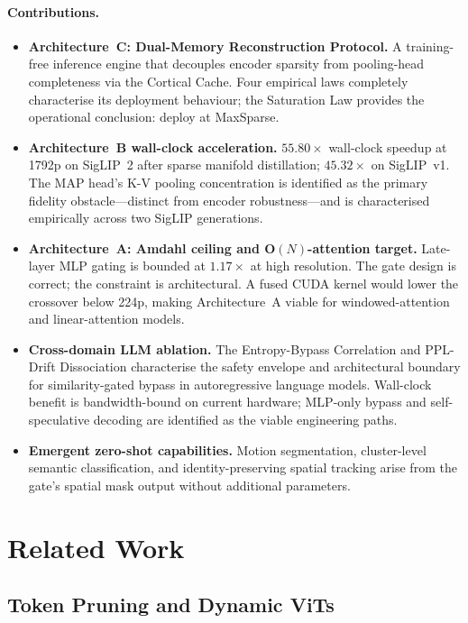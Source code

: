 \documentclass{article}
\begin{document}
\paragraph{Contributions.}
\begin{itemize}
  \item \textbf{Architecture~C: Dual-Memory Reconstruction Protocol.}
    A training-free inference engine that decouples encoder sparsity from
    pooling-head completeness via the Cortical Cache. Four empirical laws
    completely characterise its deployment behaviour; the Saturation Law
    provides the operational conclusion: deploy at MaxSparse.
  \item \textbf{Architecture~B wall-clock acceleration.}
    $55.80\times$ wall-clock speedup at 1792p on SigLIP~2 after sparse
    manifold distillation; $45.32\times$ on SigLIP~v1. The MAP head's
    K-V pooling concentration is identified as the primary fidelity
    obstacle---distinct from encoder robustness---and is characterised
    empirically across two SigLIP generations.
  \item \textbf{Architecture~A: Amdahl ceiling and O$(N)$-attention target.}
    Late-layer MLP gating is bounded at $1.17\times$ at high resolution.
    The gate design is correct; the constraint is architectural. A fused
    CUDA kernel would lower the crossover below 224p, making Architecture~A
    viable for windowed-attention and linear-attention models.
  \item \textbf{Cross-domain LLM ablation.}
    The Entropy-Bypass Correlation and PPL-Drift Dissociation characterise
    the safety envelope and architectural boundary for similarity-gated
    bypass in autoregressive language models. Wall-clock benefit is
    bandwidth-bound on current hardware; MLP-only bypass and
    self-speculative decoding are identified as the viable engineering paths.
  \item \textbf{Emergent zero-shot capabilities.}
    Motion segmentation, cluster-level semantic classification, and
    identity-preserving spatial tracking arise from the gate's spatial
    mask output without additional parameters.
\end{itemize}

\section{Related Work}\label{related-work}

\subsection{Token Pruning and Dynamic ViTs}
\end{document}

